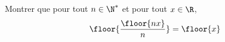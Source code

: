 \begin{exercice}
Montrer que pour tout $n\in \N^*$ et pour tout $x\in \R$, 
$$\floor{\frac{\floor{nx}}{n}} =\floor{x}$$

\end{exercice}